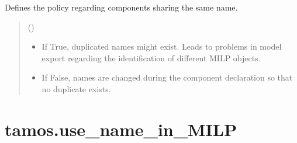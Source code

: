 \documentclass[letterpaper,10pt,english]{sphinxmanual}
\begin{document}
\begin{fulllineitems}
\label{\detokenize{generated/tamos.allow_duplicated_names:tamos.allow_duplicated_names}}
\pysigstartsignatures
{}
\pysigstopsignatures
\sphinxAtStartPar
Defines the policy regarding components sharing the same name.
\begin{quote}\begin{description}
\sphinxAtStartPar
{} () \textendash{} \begin{itemize}
\item {} 
\sphinxAtStartPar
If True, duplicated names might exist.
Leads to problems in model export regarding the identification of different MILP objects.

\item {} 
\sphinxAtStartPar
If False, names are changed during the component declaration so that no duplicate exists.

\end{itemize}


\end{description}\end{quote}

\end{fulllineitems}


\sphinxstepscope


\section{tamos.use\_name\_in\_MILP}
\label{\detokenize{generated/tamos.use_name_in_MILP:tamos-use-name-in-milp}}\label{\detokenize{generated/tamos.use_name_in_MILP::doc}}
\end{document}
